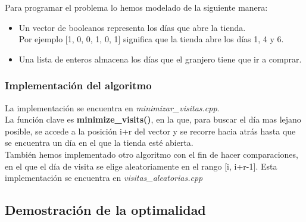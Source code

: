 Para programar el problema lo hemos modelado de la siguiente manera:\\

\begin{itemize}
\item Un vector de booleanos representa los días que abre la tienda.\\
Por ejemplo [1, 0, 0, 1, 0, 1] significa que la tienda abre los días 1, 4 y 6.\\
\item Una lista de enteros almacena los días que el granjero tiene que ir a comprar.
\end{itemize}


\subsubsection{Implementación del algoritmo}

La implementación se encuentra en \textit{minimizar\_visitas.cpp}.\\
La función clave es \textbf{minimize\_visits()}, en la que, para buscar el día mas lejano posible, se accede a la posición i+r del vector y se recorre hacia atrás hasta que se encuentra un día en el que la tienda esté abierta.\\

También hemos implementado otro algoritmo con el fin de hacer comparaciones, en el que el día de visita se elige aleatoriamente en el rango [i, i+r-1]. Esta implementación se encuentra en \textit{visitas\_aleatorias.cpp}\\



\subsection{Demostración de la optimalidad}
